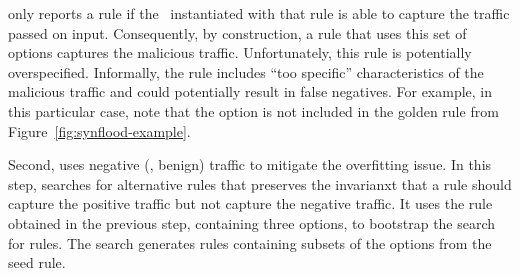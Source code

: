 \documentclass[sigconf,review, anonymous]{acmart}
\begin{document}

\noindent
\tname{} only reports a rule if the \nids\ instantiated with that rule
is able to capture the traffic passed on input. Consequently, by
construction, a rule that uses this set of options captures the
malicious traffic. Unfortunately, this rule is potentially
overspecified. Informally, the rule includes ``too specific''
characteristics of the malicious traffic and could potentially result
in false negatives. For example, in this particular case, note that
the option  is not included in the golden rule
from Figure~\ref{fig:synflood-example}.

Second, \tname{} uses negative (\ie{}, benign) traffic to mitigate the
overfitting issue. In this step, \tname{} searches for alternative
rules that preserves the invarianxt that a rule should capture the
positive traffic but not capture the negative traffic. It uses the
rule obtained in the previous step, containing three options, to
bootstrap the search for rules. The search generates rules containing
subsets of the options from the seed rule.
\end{document}
